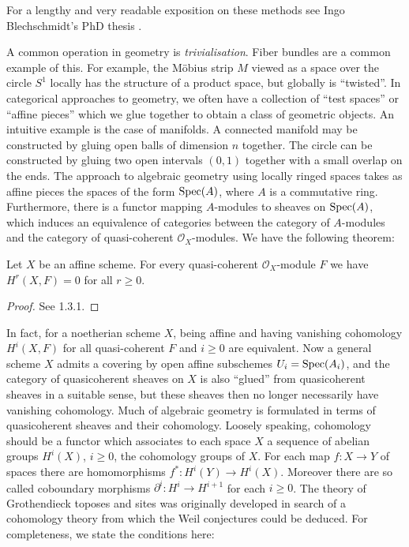 For a lengthy and very readable exposition on these methods see Ingo Blechschmidt's PhD thesis \cite{Blechschmidt}.

A common operation in geometry is \textit{trivialisation}. Fiber bundles are a common example of this. For example, the M\"obius strip $M$ viewed as a space over the circle $S^1$ locally has the structure of a product space, but globally is ``twisted''. In categorical approaches to geometry, we often have a collection of ``test spaces'' or ``affine pieces'' which we glue together to obtain a class of geometric objects. An intuitive example is the case of manifolds. A connected manifold may be constructed by gluing open balls of dimension $n$ together. The circle can be constructed by gluing two open intervals $(0,1)$ together with a small overlap on the ends. The approach to algebraic geometry using locally ringed spaces takes as affine pieces the spaces of the form $\operatorname{Spec}(A)$, where $A$ is a commutative ring. Furthermore, there is a functor mapping $A$-modules to sheaves on $\operatorname{Spec}(A)$, which induces an equivalence of categories between the category of $A$-modules and the category of quasi-coherent $\mathcal{O}_X$-modules. We have the following theorem:

\begin{theorem}
	Let $X$ be an affine scheme. For every quasi-coherent $\mathcal{O}_X$-module $F$ we have $H^r(X,F)=0$ for all $r \ge 0$.
\end{theorem}

\begin{proof}
	See \cite{EGA3} 1.3.1.
\end{proof}

In fact, for a noetherian scheme $X$, being affine and having vanishing cohomology $H^i(X,F)$ for all quasi-coherent $F$ and $i \ge 0$ are equivalent. Now a general scheme $X$ admits a covering by open affine subschemes $U_i = \operatorname{Spec}(A_i)$, and the category of quasicoherent sheaves on $X$ is also ``glued'' from quasicoherent sheaves in a suitable sense, but these sheaves then no longer necessarily have vanishing cohomology. Much of algebraic geometry is formulated in terms of quasicoherent sheaves and their cohomology. Loosely speaking, cohomology should be a functor which associates to each space $X$ a sequence of abelian groups $H^i(X)$, $i \ge 0$, the cohomology groups of $X$. For each map $f: X \to Y$ of spaces there are homomorphisms $f^*: H^i(Y) \to H^i(X)$. Moreover there are so called coboundary morphisms $\partial^i : H^i \to H^{i+1}$ for each $i \ge 0$. The theory of Grothendieck toposes and sites was originally developed in search of a cohomology theory  from which the Weil conjectures could be deduced. For completeness, we state the conditions here:

